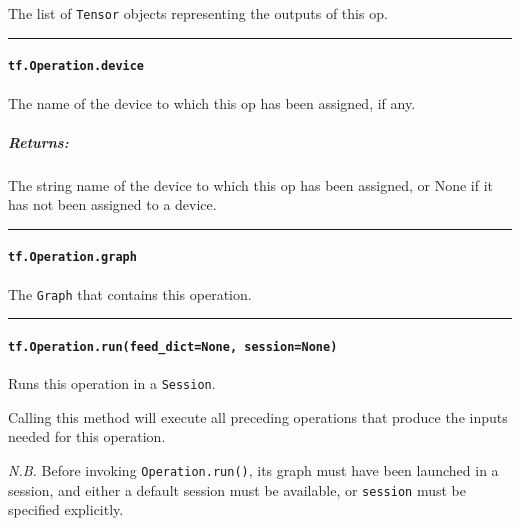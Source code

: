 The list of \lstinline{Tensor} objects representing the outputs of this op.

\begin{center}\rule{0.5\linewidth}{\linethickness}\end{center}

\paragraph{\texorpdfstring{\lstinline{tf.Operation.device}
}{tf.Operation.device }}\label{tf.operation.device}

The name of the device to which this op has been assigned, if any.

\subparagraph{Returns: }\label{returns-15}

The string name of the device to which this op has been assigned, or
None if it has not been assigned to a device.

\begin{center}\rule{0.5\linewidth}{\linethickness}\end{center}

\paragraph{\texorpdfstring{\lstinline{tf.Operation.graph}
}{tf.Operation.graph }}\label{tf.operation.graph}

The \lstinline{Graph} that contains this operation.

\begin{center}\rule{0.5\linewidth}{\linethickness}\end{center}

\paragraph{\texorpdfstring{\lstinline{tf.Operation.run(feed_dict=None, session=None)}
}{tf.Operation.run(feed_dict=None, session=None) }}\label{tf.operation.runfeedux5fdictnone-sessionnone}

Runs this operation in a \lstinline{Session}.

Calling this method will execute all preceding operations that produce
the inputs needed for this operation.

\emph{N.B.} Before invoking \lstinline{Operation.run()}, its graph must
have been launched in a session, and either a default session must be
available, or \lstinline{session} must be specified explicitly.

